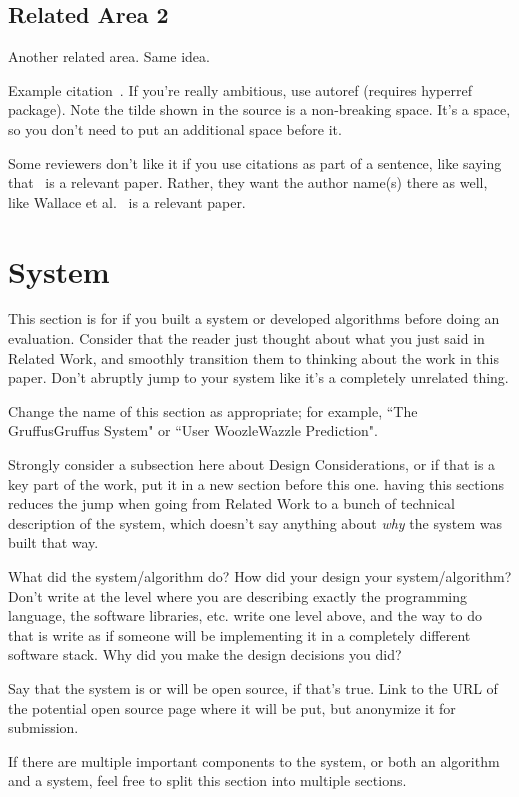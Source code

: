 \documentclass[manuscript,review,anonymous]{acmart}
\begin{document}
\subsection{Related Area 2}
Another related area.
Same idea.

Example citation~\cite{wallace2017drafty}. If you're really ambitious, use autoref (requires hyperref package). Note the tilde shown in the source is a non-breaking space. It's a space, so you don't need to put an additional space before it.

Some reviewers don't like it if you use citations as part of a sentence, like saying that~\cite{wallace2017drafty} is a relevant paper. Rather, they want the author name(s) there as well, like Wallace et al.~\cite{wallace2017drafty} is a relevant paper.

\section{System}
This section is for if you built a system or developed algorithms before doing an evaluation.
Consider that the reader just thought about what you just said in Related Work, and smoothly transition them to thinking about the work in this paper.
Don't abruptly jump to your system like it's a completely unrelated thing.

Change the name of this section as appropriate; for example, ``The GruffusGruffus System" or ``User WoozleWazzle Prediction".

Strongly consider a subsection here about Design Considerations, or if that is a key part of the work, put it in a new section before this one. having this sections reduces the jump when going from Related Work to a bunch of technical description of the system, which doesn't say anything about \emph{why} the system was built that way.

What did the system/algorithm do?
How did your design your system/algorithm? Don't write at the level where you are describing exactly the programming language, the software libraries, etc. write one level above, and the way to do that is write as if someone will be implementing it in a completely different software stack.
Why did you make the design decisions you did?

Say that the system is or will be open source, if that's true. Link to the URL of the potential open source page where it will be put, but anonymize it for submission.

If there are multiple important components to the system, or both an algorithm and a system, feel free to split this section into multiple sections.
\end{document}

